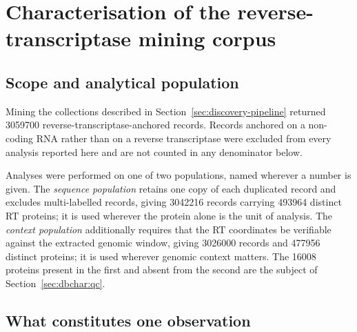 %
%
%

\section{Characterisation of the reverse-transcriptase mining corpus}
\label{sec:dbchar}

\subsection{Scope and analytical population}
\label{sec:dbchar:scope}

Mining the collections described in Section~\ref{sec:discovery-pipeline} returned \num{3059700}
reverse-transcriptase-anchored records. Records anchored on a non-coding RNA rather than on a
reverse transcriptase were excluded from every analysis reported here and are not counted in any
denominator below.

Analyses were performed on one of two populations, named wherever a number is given. The
\emph{sequence population} retains one copy of each duplicated record and excludes multi-labelled
records, giving \num{3042216} records carrying \num{493964} distinct RT proteins; it is used
wherever the protein alone is the unit of analysis. The \emph{context population} additionally
requires that the RT coordinates be verifiable against the extracted genomic window, giving
\num{3026000} records and \num{477956} distinct proteins; it is used wherever genomic context
matters. The \num{16008} proteins present in the first and absent from the second are the subject
of Section~\ref{sec:dbchar:qc}.

\subsection{What constitutes one observation}
\label{sec:dbchar:units}

